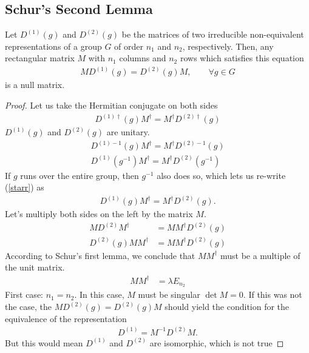 \subsection{Schur's Second Lemma} %
\label{sub:Schur's Second Lemma}
\begin{theorem}
    Let $D^{(1)}(g)$ and $D^{(2)}(g)$ be the matrices of two irreducible non-equivalent
    representations of a group $G$ of order $n_1$ and $n_2$, respectively. Then, any
    rectangular matrix $M$ with $n_1$ columns and $n_2$ rows which satisfies this
    equation
    \begin{align}
        MD^{(1)}(g)=D^{(2)}(g)M,\qquad\forall g\in G
    \end{align}
    is a null matrix.
\end{theorem}

\begin{proof}
Let us take the Hermitian conjugate on both sides
\begin{align}
    D^{(1)\dagger}(g)M^\dagger=M^\dagger D^{(2)\dagger}(g)
\end{align}
$D^{(1)}(g)$ and $D^{(2)}(g)$ are unitary.
\begin{align}
    D^{(1)-1}(g)M^\dagger=M^\dagger D^{(2)-1}(g)\\
    D^{(1)}(g^{-1})M^\dagger=M^\dagger D^{(2)}(g^{-1})\label{starr}
\end{align}
If $g$ runs over the entire group, then $g^{-1}$ also does so, which lets us
re-write (\autoref{starr}) as
\begin{align}
    D^{(1)}(g)M^\dagger=M^\dagger D^{(2)}(g).
\end{align}
Let's multiply both sides on the left by the matrix $M$.
\begin{align}
    MD^{(2)}M^\dagger&=MM^\dagger D^{(2)}(g)\\
    D^{(2)}(g)MM^\dagger&=MM^\dagger D^{(2)}(g)
\end{align}
According to Schur's first lemma, we conclude that $MM^\dagger$ must be a
multiple of the unit matrix.
\begin{align}
    MM^\dagger&=\lambda E_{n_2}
\end{align}
First case: $n_1=n_2$. In this case, $M$ must be singular $\det M=0$.
If this was not the case, the $MD^{(2)}(g)=D^{(2)}(g)M$ should yield the
condition for the equivalence of the representation
\begin{align}
    D^{(1)}=M^{-1}D^{(2)}M.
\end{align}
But this would mean $D^{(1)}$ and $D^{(2)}$ are isomorphic, which is not true

\end{proof}
